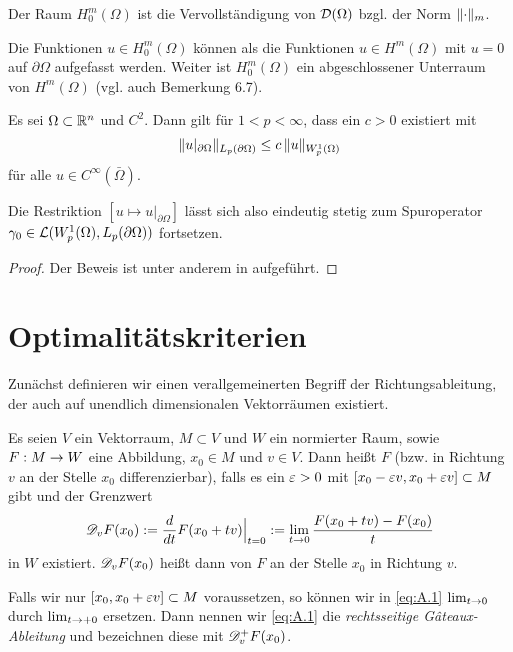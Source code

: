\begin{defi}\label{def:A.7}
Der Raum $H^m_0(\Omega)$ ist die Vervollständigung von $\mathcal D(\Omega)$ bzgl. der Norm $\lVert \cdot\rVert_m$.
\end{defi}

\begin{bem}\label{bem:A.8}
Die Funktionen $u \in H^m_0(\Omega)$ können als die Funktionen $u \in H^m(\Omega)$ mit $u = 0$ auf $\partial \Omega$ aufgefasst werden. Weiter ist $H^m_0(\Omega)$ ein abgeschlossener Unterraum von $H^m(\Omega)$ (vgl. auch \cite{Walker} Bemerkung 6.7).
\end{bem}


\begin{theorem}
  \label{theorem:A.9}
  Es sei $\Omega\subset\mathbb{R}^n$ und $C^2$. Dann gilt für $1<p<\infty$, dass ein $c>0$ existiert mit
  \[ \lVert u\rvert_{\partial\Omega}\rVert_{L_p(\partial\Omega)}\leq c\, \lVert u\rVert_{W_p^1(\Omega)} \]
  für alle $u\in C^\infty(\bar\Omega)$.

  Die Restriktion $[u\mapsto u\rvert_{\partial\Omega}]$ lässt sich also eindeutig stetig zum Spuroperator $\gamma_0\in\mathcal{L}(W_p^1(\Omega),L_p(\partial\Omega))$ fortsetzen.
\end{theorem}

\begin{proof}
Der Beweis ist unter anderem in \cite{Walker} aufgeführt.
\end{proof}

\section{Optimalitätskriterien}
\label{anhang:A.2}

Zunächst definieren wir einen verallgemeinerten Begriff der Richtungsableitung, der auch auf unendlich dimensionalen Vektorräumen existiert.

\begin{defi}\label{def:Gateaux-Ableitung}
Es seien $V$ ein Vektorraum, $M\subset V$ und $W$ ein normierter Raum, sowie $F: M \rightarrow W$ eine Abbildung, $x_0 \in M$ und $v \in V$. Dann heißt $F$ \textit{} (bzw. in Richtung $v$ an der Stelle $x_0$ differenzierbar), falls es ein $\varepsilon >0$ mit $[x_0-\varepsilon v, x_0 + \varepsilon v] \subset M$ gibt und der Grenzwert
\begin{align}\label{eq:A.1}
	\mathscr D_v F (x_0) :=\frac d{d t} F(x_0+tv)\Big|_{t=0} := \lim_{t\rightarrow 0} \frac{F(x_0+tv)-F(x_0)}t
\end{align}
in $W$ existiert. $\mathscr D_vF(x_0)$ heißt dann \textit{} von $F$ an der Stelle $x_0$ in Richtung $v$.

Falls wir nur $[x_0,x_0 + \varepsilon v] \subset M$ voraussetzen, so können wir in \eqref{eq:A.1} $\lim_{t\rightarrow 0}$ durch $\lim_{t \rightarrow + 0}$ ersetzen. Dann nennen wir \eqref{eq:A.1} die \textit{rechtsseitige Gâteaux-Ableitung} und bezeichnen diese mit $\mathscr D^+_v F(x_0)$.
\end{defi}

